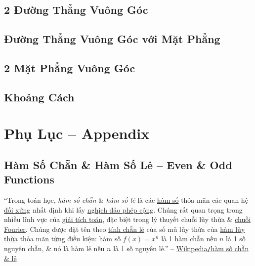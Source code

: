 \documentclass[oneside]{book}
\numberwithin{equation}{section}
\begin{document}

\section{2 Đường Thẳng Vuông Góc}


\section{Đường Thẳng Vuông Góc với Mặt Phẳng}


\section{2 Mặt Phẳng Vuông Góc}


\section{Khoảng Cách}


\appendix

\chapter{Phụ Lục -- Appendix}

\section{Hàm Số Chẵn \& Hàm Số Lẻ -- Even \& Odd Functions}
\label{sect: even & odd functions}
``Trong toán học, \textit{hàm số chẵn} \& \textit{hàm số lẻ} là các \href{https://vi.wikipedia.org/wiki/H%C3%A0m_s%E1%BB%91}{hàm số} thỏa mãn các quan hệ \href{https://vi.wikipedia.org/wiki/%C4%90%E1%BB%91i_x%E1%BB%A9ng}{đối xứng} nhất định khi lấy \href{https://vi.wikipedia.org/wiki/Ngh%E1%BB%8Bch_%C4%91%E1%BA%A3o_ph%C3%A9p_c%E1%BB%99ng}{nghịch đảo phép cộng}. Chúng rất quan trọng trong nhiều lĩnh vực của \href{https://vi.wikipedia.org/wiki/Gi%E1%BA%A3i_t%C3%ADch_to%C3%A1n}{giải tích toán}, đặc biệt trong lý thuyết chuỗi lũy thừa \& \href{https://vi.wikipedia.org/wiki/Chu%E1%BB%97i_Fourier}{chuỗi Fourier}. Chúng được đặt tên theo \href{https://vi.wikipedia.org/wiki/T%C3%ADnh_ch%E1%BA%B5n_l%E1%BA%BB}{tính chẵn lẻ} của số mũ lũy thừa của \href{https://vi.wikipedia.org/wiki/L%C5%A9y_th%E1%BB%ABa}{hàm lũy thừa} thỏa mãn từng điều kiện: hàm số $f(x) = x^n$ là 1 hàm chẵn nếu $n$ là 1 số nguyên chẵn, \& nó là hàm lẻ nếu $n$ là 1 số nguyên lẻ.'' -- \href{https://vi.wikipedia.org/wiki/H%C3%A0m_s%E1%BB%91_ch%E1%BA%B5n_v%C3%A0_l%E1%BA%BB}{Wikipedia\texttt{/}hàm số chẵn \& lẻ}
\end{document}
